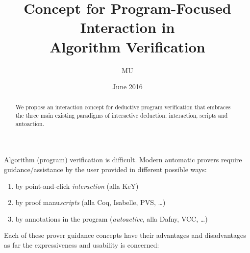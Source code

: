 \documentclass{article}
\begin{document}
\title{Concept for Program-Focused Interaction in \\Algorithm Verification}
\author{MU}
\date{June 2016}

\maketitle

\begin{abstract}
  We propose an interaction concept for deductive program verification
  that embraces the three main existing paradigms of interactive
  deduction: interaction, scripts and autoaction.
\end{abstract}

Algorithm (program) verification is difficult. Modern automatic
provers require guidance/assistance by the user provided in different
possible ways:
\begin{enumerate}
\item by point-and-click \emph{interaction} (alla KeY)
\item by proof manu\emph{scripts} (alla Coq, Isabelle, PVS, \dots)
\item by annotations in the program (\emph{autoactive}, alla Dafny, VCC, \ldots)
\end{enumerate}

Each of these prover guidance concepts have their advantages and
disadvantages as far the expressiveness and usability is concerned:
\end{document}
